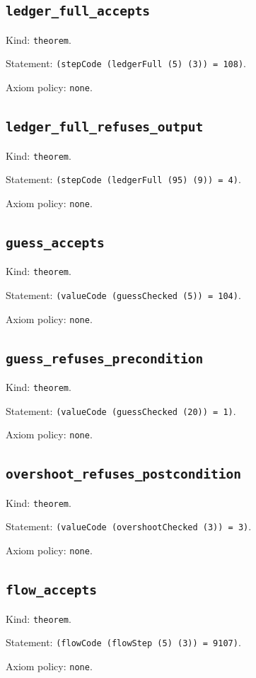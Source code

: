 \documentclass[11pt]{article}
\begin{document}
\subsection*{\texttt{ledger\_full\_accepts}}
\noindent Kind: \texttt{theorem}.\par
\noindent Statement: \texttt{(stepCode (ledgerFull (5) (3)) = 108)}.\par
\noindent Axiom policy: \texttt{none}.\par
\subsection*{\texttt{ledger\_full\_refuses\_output}}
\noindent Kind: \texttt{theorem}.\par
\noindent Statement: \texttt{(stepCode (ledgerFull (95) (9)) = 4)}.\par
\noindent Axiom policy: \texttt{none}.\par
\subsection*{\texttt{guess\_accepts}}
\noindent Kind: \texttt{theorem}.\par
\noindent Statement: \texttt{(valueCode (guessChecked (5)) = 104)}.\par
\noindent Axiom policy: \texttt{none}.\par
\subsection*{\texttt{guess\_refuses\_precondition}}
\noindent Kind: \texttt{theorem}.\par
\noindent Statement: \texttt{(valueCode (guessChecked (20)) = 1)}.\par
\noindent Axiom policy: \texttt{none}.\par
\subsection*{\texttt{overshoot\_refuses\_postcondition}}
\noindent Kind: \texttt{theorem}.\par
\noindent Statement: \texttt{(valueCode (overshootChecked (3)) = 3)}.\par
\noindent Axiom policy: \texttt{none}.\par
\subsection*{\texttt{flow\_accepts}}
\noindent Kind: \texttt{theorem}.\par
\noindent Statement: \texttt{(flowCode (flowStep (5) (3)) = 9107)}.\par
\noindent Axiom policy: \texttt{none}.\par
\end{document}
